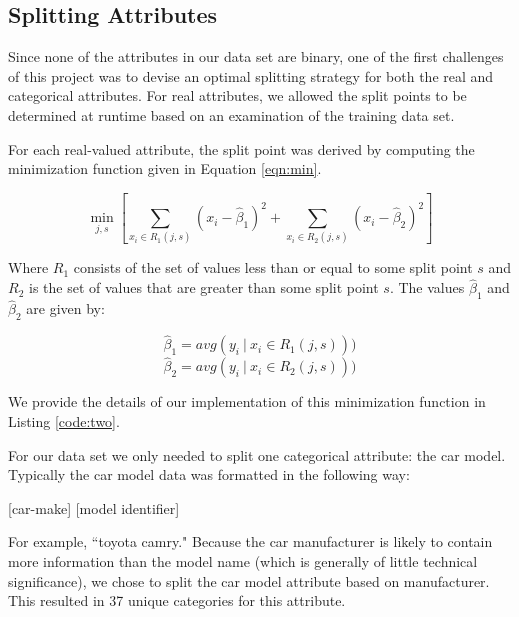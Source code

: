 \documentclass[letterpaper,12pt]{article}
\begin{document}
 
\subsection{Splitting Attributes}

Since none of the attributes in our data set are binary, one of the first challenges of this project was to devise an optimal splitting strategy for both the real and categorical attributes. For real attributes, we allowed the split points to be determined at runtime based on an examination of the training data set.

For each real-valued attribute, the split point was derived by computing the minimization function given in Equation \ref{eqn:min}.

\begin{equation}
  \min_{j,s} \left[\sum_{x_i \in R_1(j,s)} (x_i - \hat\beta_1)^2 + \sum_{x_i \in R_2(j,s)} (x_i - \hat\beta_2)^2\right]
  \label{eqn:min}
\end{equation} 

Where $R_1$ consists of the set of values less than or equal to some split point $s$ and $R_2$ is the set of values that are greater than some split point $s$. The values $\hat\beta_1$ and $\hat\beta_2$ are given by:

\[
\hat\beta_1 = avg(y_i ~|~ x_i \in R_1(j,s)))
\]
\[
\hat\beta_2 = avg(y_i ~|~ x_i \in R_2(j,s)))
\]

We provide the details of our implementation of this minimization function in Listing \ref{code:two}.

For our data set we only needed to split one categorical attribute: the car model. Typically the car model data was formatted in the following way:

\begin{center}
  [car-make] [model identifier]
\end{center}

For example, ``toyota camry." Because the car manufacturer is likely to contain more information than the model name (which is generally of little technical significance), we chose to split the car model attribute based on manufacturer. This resulted in 37 unique categories for this attribute. 
\end{document}
